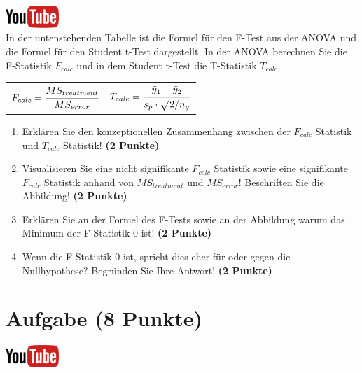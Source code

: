\documentclass[a4paper, 9pt]{scrartcl}\usepackage[]{graphicx}\usepackage[]{xcolor}
\begin{document}
\hfill\href{https://youtu.be/FjjJXkFJfIY}{\includegraphics[width =
  2cm]{img/youtube}}\\[1Ex]


In der untenstehenden Tabelle ist die Formel f{\"u}r den F-Test aus der ANOVA
und die Formel f{\"u}r den Student t-Test dargestellt. In der ANOVA berechnen
Sie die F-Statistik $F_{calc}$ und in dem Student t-Test die T-Statistik
$T_{calc}$.

\begin{center}
  \begin{tabular}{cc}
    $F_{calc} = \cfrac{MS_{treatment}}{MS_{error}}$ & $T_{calc} = \cfrac{\bar{y}_1 - \bar{y}_2}{s_p \cdot \sqrt{2/n_g}}$\\
  \end{tabular}
\end{center}


\begin{enumerate}
\item Erkl{\"a}ren Sie den konzeptionellen Zusammenhang zwischen der $F_{calc}$
  Statistik und $T_{calc}$ Statistik! \textbf{(2 Punkte)}
\item Visualisieren Sie eine nicht signifikante $F_{calc}$ Statistik sowie
  eine signifikante $F_{calc}$ Statistik anhand von $MS_{treatment}$ und
  $MS_{error}$! Beschriften Sie die Abbildung! \textbf{(2 Punkte)}
\item Erkl{\"a}ren Sie an der Formel des F-Tests sowie an der Abbildung warum
  das Minimum der F-Statistik 0 ist! \textbf{(2 Punkte)}
\item Wenn die F-Statistik 0 ist, spricht dies eher f{\"u}r oder gegen die
  Nullhypothese? Begr{\"u}nden Sie Ihre Antwort! \textbf{(2 Punkte)}
\end{enumerate}

 
\clearpage

\section{Aufgabe \hfill (8 Punkte)}

\hfill\href{https://youtu.be/2qG1Dws0MJo}{\includegraphics[width =
  2cm]{img/youtube}}\\[1Ex]
\end{document}
